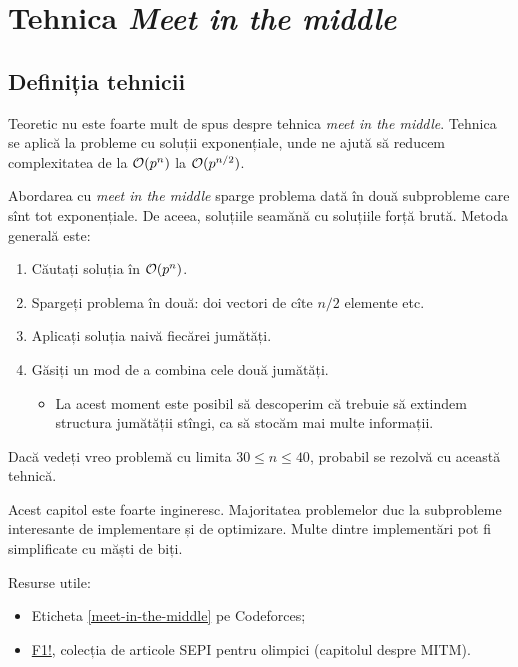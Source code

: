 \documentclass[../main.tex]{subfiles}
\begin{document}
\chapter{Tehnica \textit{Meet in the middle}}

\section{Definiția tehnicii}

Teoretic nu este foarte mult de spus despre tehnica \textit{meet in the middle}. Tehnica se aplică la probleme cu soluții exponențiale, unde ne ajută să reducem complexitatea de la $\mathcal{O}(p^n)$ la $\mathcal{O}(p^{n/2})$.

Abordarea cu \textit{meet in the middle} sparge problema dată în două subprobleme care sînt tot exponențiale. De aceea, soluțiile seamănă cu soluțiile forță brută. Metoda generală este:

\begin{enumerate}
  \item Căutați soluția în $\mathcal{O}(p^n)$.

  \item Spargeți problema în două: doi vectori de cîte $n/2$ elemente etc.

  \item Aplicați soluția naivă fiecărei jumătăți.

  \item Găsiți un mod de a combina cele două jumătăți.

  \begin{itemize}
    \item La acest moment este posibil să descoperim că trebuie să extindem structura jumătății stîngi, ca să stocăm mai multe informații.
  \end{itemize}
\end{enumerate}

Dacă vedeți vreo problemă cu limita $30 \leq n \leq 40$, probabil se rezolvă cu această tehnică. 

Acest capitol este foarte ingineresc. Majoritatea problemelor duc la subprobleme interesante de implementare și de optimizare. Multe dintre implementări pot fi simplificate cu măști de biți.

Resurse utile:

\begin{itemize}
  \item Eticheta \href{https://codeforces.com/problemset?order=BY_RATING_ASC\&tags=meet-in-the-middle}{[meet-in-the-middle]} pe Codeforces;
  \item \href{https://sepi.ro/assets/upload-file/infobits-f1.pdf}{F1!}, colecția de articole SEPI pentru olimpici (capitolul despre MITM).

\end{itemize}
\end{document}
